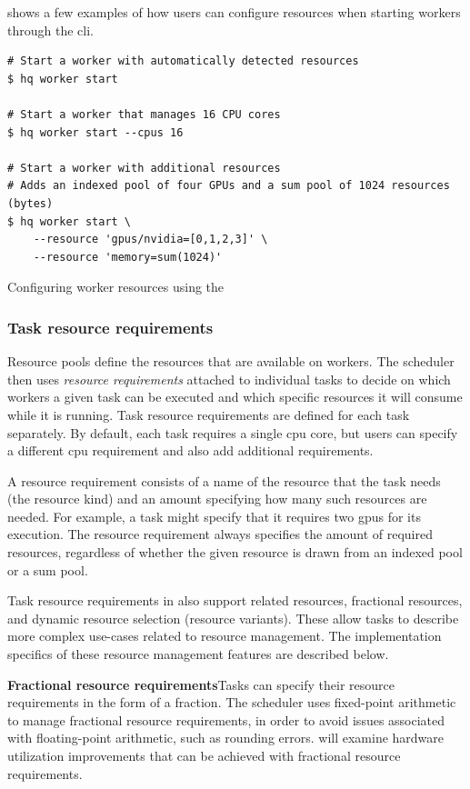  shows a few examples of how users can configure resources
when starting workers through the \gls{cli}.

\begin{listing}[h]
	\begin{verbatim}
# Start a worker with automatically detected resources
$ hq worker start

# Start a worker that manages 16 CPU cores
$ hq worker start --cpus 16

# Start a worker with additional resources
# Adds an indexed pool of four GPUs and a sum pool of 1024 resources (bytes)
$ hq worker start \
	--resource 'gpus/nvidia=[0,1,2,3]' \
	--resource 'memory=sum(1024)'
	\end{verbatim}
	\caption{Configuring worker resources using the \hyperqueue{} }
	\label{lst:hq-cli-worker-resources}
\end{listing}

\subsubsection*{Task resource requirements}
Resource pools define the resources that are available on workers. The scheduler then uses
\emph{resource requirements} attached to individual tasks to decide on which workers a given task can be
executed and which specific resources it will consume while it is running. Task resource
requirements are defined for each task separately. By default, each task requires a single
\gls{cpu} core, but users can specify a different \gls{cpu} requirement
and also add additional requirements.

A resource requirement consists of a name of the resource that the task needs (the resource kind)
and an amount specifying how many such resources are needed. For example, a task might specify that
it requires two \glspl{gpu} for its execution. The resource requirement always
specifies the amount of required resources, regardless of whether the given resource is drawn from
an indexed pool or a sum pool.

Task resource requirements in \hyperqueue{} also support related resources, fractional
resources, and dynamic resource selection (resource variants). These allow tasks to describe more
complex use-cases related to resource management. The implementation specifics of these resource
management features are described below.

\vspace{2mm}\textbf{Fractional resource requirements}\enskip{}Tasks can specify
their resource requirements in the form of a fraction. The scheduler uses fixed-point arithmetic to
manage fractional resource requirements, in order to avoid issues associated with floating-point
arithmetic, such as rounding errors. \Autoref{sec:hq-exp-fractional-resources} will examine
hardware utilization improvements that can be achieved with fractional resource requirements.

